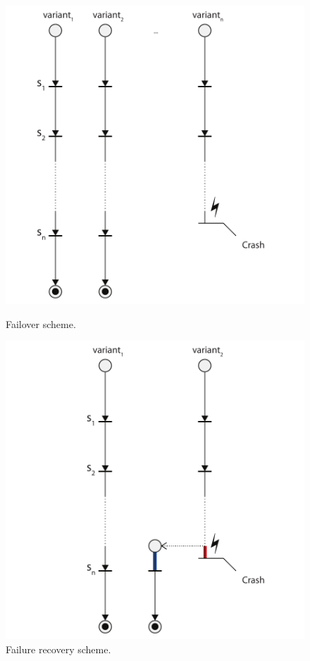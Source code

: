 \begin{figure}[t]
\begin{minipage}[b]{0.5\textwidth}
  \includegraphics[width=\textwidth]{overview/figures/failover}
  \caption{Failover scheme.}
  \label{fig:failover-scheme}
\end{minipage}
\begin{minipage}[b]{0.5\textwidth}
  \includegraphics[width=\textwidth]{overview/figures/failrecovery}
  \caption{Failure recovery scheme.}
  \label{fig:failrecovery-scheme}
\end{minipage}
\end{figure}

